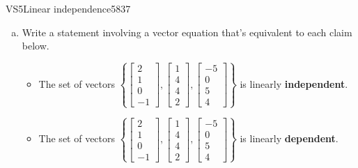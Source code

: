 \begin{exercise}{VS5}{Linear independence}{5837} 
\begin{exerciseStatement} 

\begin{enumerate}[(a)]
\item  

 Write a statement involving a vector equation that's equivalent to each claim below. 

 

\begin{itemize}
\item  

 The set of vectors \(\left\{ \left[\begin{array}{c}
2 \\
1 \\
0 \\
-1
\end{array}\right] , \left[\begin{array}{c}
1 \\
4 \\
4 \\
2
\end{array}\right] , \left[\begin{array}{c}
-5 \\
0 \\
5 \\
4
\end{array}\right] \right\}\) is linearly \textbf{independent}. 

 
\item  

 The set of vectors \(\left\{ \left[\begin{array}{c}
2 \\
1 \\
0 \\
-1
\end{array}\right] , \left[\begin{array}{c}
1 \\
4 \\
4 \\
2
\end{array}\right] , \left[\begin{array}{c}
-5 \\
0 \\
5 \\
4
\end{array}\right] \right\}\) is linearly \textbf{dependent}. 

 
\end{itemize}


\end{enumerate}
\end{exerciseStatement}
\end{exercise}
